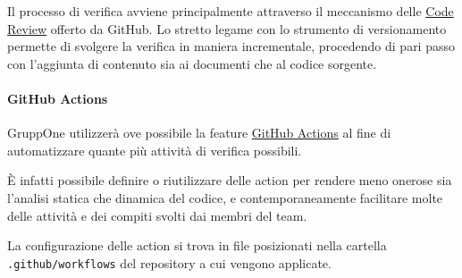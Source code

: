\documentclass[../../norme-di-progetto.tex]{subfiles}
\begin{document}
Il processo di verifica avviene principalmente attraverso il meccanismo delle \href{https://github.com/features/code-review/}{Code Review} offerto da GitHub.
Lo stretto legame con lo strumento di versionamento permette di svolgere la verifica in maniera incrementale, procedendo di pari passo con l'aggiunta di contenuto sia ai documenti che al codice sorgente.





\paragraph{GitHub Actions}%
\label{par:github_actions}

GruppOne utilizzerà ove possibile la feature \href{https://help.github.com/en/actions/automating-your-workflow-with-github-actions/about-github-actions}{GitHub Actions} al fine di automatizzare quante più attività di verifica possibili.

È infatti possibile definire o riutilizzare delle action per rendere meno onerose sia l'analisi statica che dinamica del codice, e contemporaneamente facilitare molte delle attività e dei compiti svolti dai membri del team.

La configurazione delle action si trova in file  posizionati nella cartella \verb|.github/workflows| del repository a cui vengono applicate.


\end{document}
